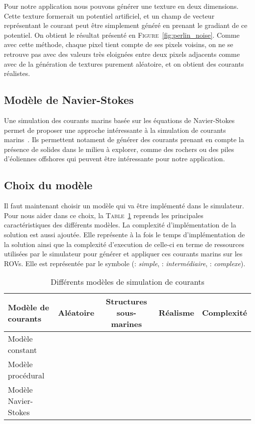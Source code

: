 				Pour notre application nous pouvons générer une texture en deux dimensions. Cette texture formerait un potentiel artificiel, et un champ de vecteur représentant le courant peut être simplement généré en prenant le gradiant de ce potentiel. On obtient le résultat présenté en \textsc{Figure}~\ref{fig:perlin_noise}. Comme avec cette méthode, chaque pixel tient compte de ses pixels voisins, on ne se retrouve pas avec des valeurs très eloignées entre deux pixels adjacents comme avec de la génération de textures purement aléatoire, et on obtient des courants réalistes. 

			\subsection{Modèle de Navier-Stokes}

				Une simulation des courants marins basée sur les équations de Navier-Stokes permet de proposer une approche intéressante à la simulation de courants marins~\cite{Garau2006current}. Ils permettent notament de générer des courants prenant en compte la présence de solides dans le milieu à explorer, comme des rochers ou des piles d'éoliennes offshores qui peuvent être intéressante pour notre application.

			\subsection{Choix du modèle}

				Il faut maintenant choisir un modèle qui va être implémenté dans le simulateur. Pour nous aider dans ce choix, la \textsc{Table}~\ref{table:courants} reprends les principales caractéristiques des différents modèles. La complexité d'implémentation de la solution est aussi ajoutée. Elle représente à la fois le temps d'implémentation de la solution ainsi que la complexité d'execution de celle-ci en terme de ressources utilisées par le simulateur pour générer et appliquer ces courants marins sur les \gls{ROV}s. Elle est représentée par le symbole \pmark (\pmark : \textit{simple}, \pmark \pmark : \textit{intermédiaire}, \pmark \pmark \pmark : \textit{complexe}).

				\begin{table}[ht]
					\centering
					\begin{tabular}{|l|c|c|c|c|}
						\hline
						Modèle de courants & Aléatoire & Structures sous-marines & Réalisme & Complexité \\
						\hline
						Modèle constant & \xmark & \xmark & \pmark & \pmark\\
						\hline
						Modèle procédural & \cmark & \xmark & \pmark \pmark & \pmark \pmark\\
						\hline
						Modèle Navier-Stokes & \xmark & \cmark & \pmark \pmark \pmark & \pmark \pmark \pmark \\
						\hline
					\end{tabular}
					\caption{Différents modèles de simulation de courants}
					\label{table:courants}
				\end{table}


